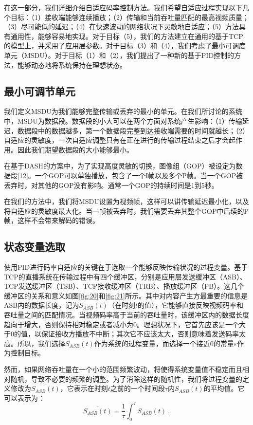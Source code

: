 在这一部分，我们详细介绍自适应码率控制方法。我们希望自适应过程实现以下几个目标：（1）接收端能够连续播放；（2）传输和当前吞吐量匹配的最高视频质量；（3）尽可能低的延迟；（4）在快速波动的网络状况下灵敏地自适应；（5）方法具有通用性，能够容易地实现。对于目标（5），我们的方法建立在通用的基于TCP的模型上，并采用了应用层参数。对于目标（3）和（4），我们考虑了最小可调度单元（MSDU）。对于目标（1）和（2），我们提出了一种新的基于PID控制的方法，能够动态地将系统保持在理想状态。

\subsection{最小可调节单元}

我们定义MSDU为我们能够完整传输或丢弃的最小的单元。在我们所讨论的系统中，MSDU为数据段。数据段的小大可以在两个方面对系统产生影响：（1）传输延迟，数据段中的数据越多，第一个数据段完整到达接收端需要的时间就越长；（2）自适应的灵敏度，一次自适应调整只有在正在进行的传输过程结束之后才会起作用。因此我们期望数据段的大小能够最小。

在基于DASH的方案中，为了实现高度灵敏的切换，图像组（GOP）被设定为数据段[12]。一个GOP可以单独播放，包含了一个I帧以及多个P帧。当一个GOP被丢弃时，对其他的GOP没有影响。通常一个GOP的持续时间是1到5秒。

在我们的方法中，我们将MSDU设置为视频帧，这样可以讲传输延迟最小化，以及将自适应的灵敏度最大化。当一帧被丢弃时，我们需要丢弃其整个GOP中后续的P帧，这样不会带来解码的错误。

\subsection{状态变量选取}

使用PID进行码率自适应的关键在于选取一个能够反映传输状况的过程变量。基于TCP的直播系统在传输过程中有四个缓冲区，分别是应用层发送缓冲区（ASB）、TCP发送缓冲区（TSB）、TCP接收缓冲区（TRB）、播放缓冲区（PB）。这几个缓冲区的关系和意义如图\ref{fig:20}和\ref{fig:21}所示。其中对内容产生方最重要的信息是ASB内的数据长度，记为$S_{ASB}(t)$（在时刻$t$的值），它能够直接反映视频码率和吞吐量之间的匹配情况。当视频码率高于当前的吞吐量时，该缓冲区内的数据长度趋向于增大，否则保持相对稳定或者减小为0。理想状况下，它首先应该是一个大于0的值，以保证接收方播放不中断；其次它不应该太大，否则意味着发送码率太高。所以，我们选择$S_{ASB}(t)$作为系统的过程变量，而选择一个接近0的常量$\varepsilon$作为控制目标。

然而，如果网络吞吐量在一个小的范围频繁波动，将使得系统变量值不稳定而且相对随机，导致不必要的频繁的调整。为了消除这样的随机性，我们将过程变量的定义修改为$\overline{S_{ASB}(t)}$，它表示在时刻$t$之前的一个时间段$\tau$内$S_{ASB}(t)$的平均值。它可以表示为：
\begin{equation}
\label{eq:asb}
\overline{S_{ASB}(t)} = \dfrac{1}{\tau} \int_0^\tau {S_{ASB}(t)}\: .
\end{equation}

